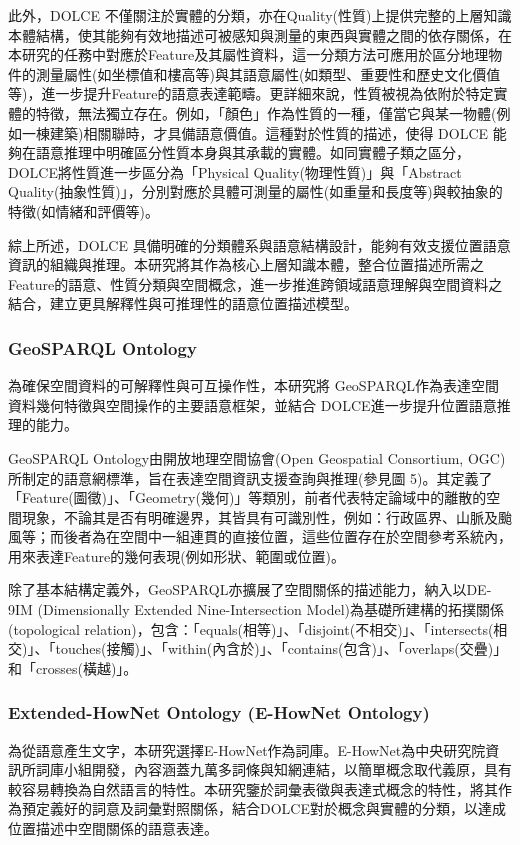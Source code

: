 此外，DOLCE 不僅關注於實體的分類，亦在Quality(性質)上提供完整的上層知識本體結構，使其能夠有效地描述可被感知與測量的東西與實體之間的依存關係，在本研究的任務中對應於Feature及其屬性資料，這一分類方法可應用於區分地理物件的測量屬性(如坐標值和樓高等)與其語意屬性(如類型、重要性和歷史文化價值等)，進一步提升Feature的語意表達範疇。更詳細來說，性質被視為依附於特定實體的特徵，無法獨立存在。例如，「顏色」作為性質的一種，僅當它與某一物體(例如一棟建築)相關聯時，才具備語意價值。這種對於性質的描述，使得 DOLCE 能夠在語意推理中明確區分性質本身與其承載的實體。如同實體子類之區分，DOLCE將性質進一步區分為「Physical Quality(物理性質)」與「Abstract Quality(抽象性質)」，分別對應於具體可測量的屬性(如重量和長度等)與較抽象的特徵(如情緒和評價等)。

綜上所述，DOLCE 具備明確的分類體系與語意結構設計，能夠有效支援位置語意資訊的組織與推理。本研究將其作為核心上層知識本體，整合位置描述所需之Feature的語意、性質分類與空間概念，進一步推進跨領域語意理解與空間資料之結合，建立更具解釋性與可推理性的語意位置描述模型。

\subsubsection{GeoSPARQL Ontology}

為確保空間資料的可解釋性與可互操作性，本研究將 GeoSPARQL作為表達空間資料幾何特徵與空間操作的主要語意框架，並結合 DOLCE進一步提升位置語意推理的能力。

GeoSPARQL Ontology由開放地理空間協會(Open Geospatial Consortium, OGC)所制定的語意網標準，旨在表達空間資訊支援查詢與推理(參見圖 5)。其定義了「Feature(圖徵)」、「Geometry(幾何)」等類別，前者代表特定論域中的離散的空間現象，不論其是否有明確邊界，其皆具有可識別性，例如：行政區界、山脈及颱風等；而後者為在空間中一組連貫的直接位置，這些位置存在於空間參考系統內，用來表達Feature的幾何表現(例如形狀、範圍或位置)。

除了基本結構定義外，GeoSPARQL亦擴展了空間關係的描述能力，納入以DE-9IM (Dimensionally Extended Nine-Intersection Model)為基礎所建構的拓撲關係(topological relation)，包含：「equals(相等)」、「disjoint(不相交)」、「intersects(相交)」、「touches(接觸)」、「within(內含於)」、「contains(包含)」、「overlaps(交疊)」和「crosses(橫越)」。

\subsubsection{Extended-HowNet Ontology (E-HowNet Ontology)}

為從語意產生文字，本研究選擇E-HowNet作為詞庫。E-HowNet為中央研究院資訊所詞庫小組開發，內容涵蓋九萬多詞條與知網連結，以簡單概念取代義原，具有較容易轉換為自然語言的特性\citep{RN186}。本研究鑒於詞彙表徵與表達式概念的特性，將其作為預定義好的詞意及詞彙對照關係，結合DOLCE對於概念與實體的分類，以達成位置描述中空間關係的語意表達。

